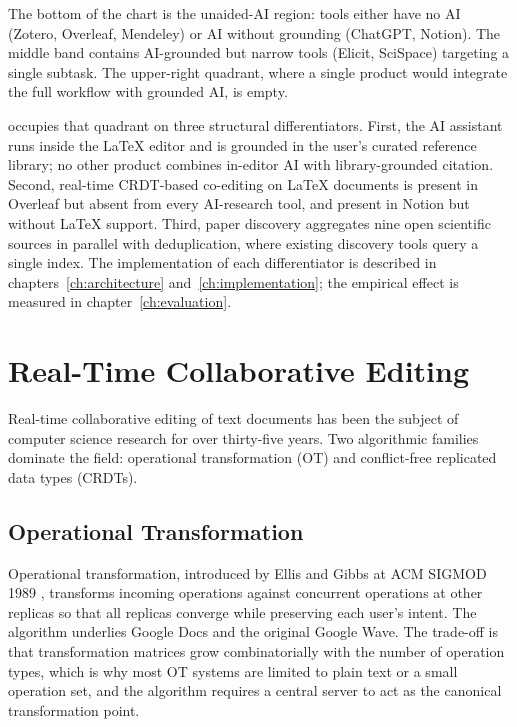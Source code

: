 The bottom of the chart is the unaided-AI region: tools either have no AI (Zotero, Overleaf, Mendeley) or AI without grounding (ChatGPT, Notion). The middle band contains AI-grounded but narrow tools (Elicit, SciSpace) targeting a single subtask. The upper-right quadrant, where a single product would integrate the full workflow with grounded AI, is empty.

\sh{} occupies that quadrant on three structural differentiators. First, the AI assistant runs inside the LaTeX editor and is grounded in the user's curated reference library; no other product combines in-editor AI with library-grounded citation. Second, real-time CRDT-based co-editing on LaTeX documents is present in Overleaf but absent from every AI-research tool, and present in Notion but without LaTeX support. Third, paper discovery aggregates nine open scientific sources in parallel with deduplication, where existing discovery tools query a single index. The implementation of each differentiator is described in chapters~\ref{ch:architecture} and~\ref{ch:implementation}; the empirical effect is measured in chapter~\ref{ch:evaluation}.

\section{Real-Time Collaborative Editing}
\label{sec:lit-collab}

Real-time collaborative editing of text documents has been the subject of computer science research for over thirty-five years. Two algorithmic families dominate the field: operational transformation (OT) and conflict-free replicated data types (CRDTs).

\subsection{Operational Transformation}

Operational transformation, introduced by Ellis and Gibbs at ACM SIGMOD 1989 \cite{ellis1989operational}, transforms incoming operations against concurrent operations at other replicas so that all replicas converge while preserving each user's intent. The algorithm underlies Google Docs and the original Google Wave. The trade-off is that transformation matrices grow combinatorially with the number of operation types, which is why most OT systems are limited to plain text or a small operation set, and the algorithm requires a central server to act as the canonical transformation point.

